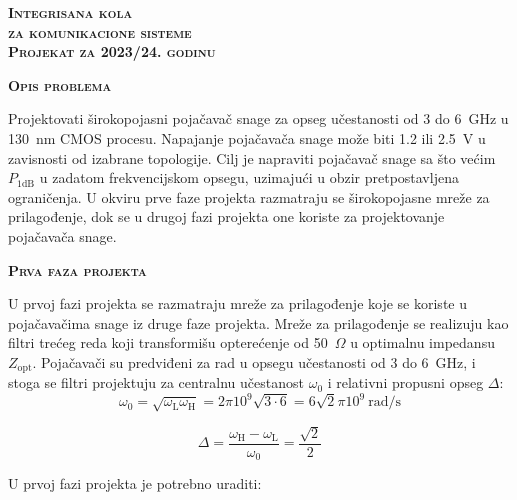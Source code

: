 \documentclass[a4paper]{article}
\begin{document}
\newcommand{\mr}[1]{\mathrm{#1}}
\renewcommand{\figurename}{Slika}

\begin{center}
\huge{\textbf{\textsc{Integrisana kola \\za komunikacione sisteme\\Projekat za 2023/24. godinu}}}
\end{center}


\begin{center}
\large{\textbf{\textsc{Opis problema}}}
\end{center}

Projektovati širokopojasni pojačavač snage za opseg učestanosti od 3 do 6~GHz u 130~nm CMOS procesu.
Napajanje pojačavača snage može biti 1.2 ili 2.5~V u zavisnosti od izabrane topologije.
Cilj je napraviti pojačavač snage sa što većim $P_\mr{1dB}$ u zadatom frekvencijskom opsegu, uzimajući u obzir pretpostavljena ograničenja.
U okviru prve faze projekta razmatraju se širokopojasne mreže za prilagođenje, dok se u drugoj fazi projekta one koriste za projektovanje pojačavača snage.


\begin{center}
\large{\textbf{\textsc{Prva faza projekta}}}
\end{center}

U prvoj fazi projekta se razmatraju mreže za prilagođenje koje se koriste u pojačavačima snage iz druge faze projekta.
Mreže za prilagođenje se realizuju kao filtri trećeg reda koji transformišu opterećenje od 50~$\Omega$ u optimalnu impedansu $Z_\mr{opt}$. 
Pojačavači su predviđeni za rad u opsegu učestanosti od 3 do 6~GHz, i stoga se filtri projektuju za centralnu učestanost $\omega_0$ i relativni propusni opseg $\Delta$:
\begin{equation*}
\omega_0 = \sqrt{\omega_\mr{L} \omega_\mr{H}} = 2 \pi 10^9 \sqrt{3\cdot 6} = 6 \sqrt{2} \pi 10^9~\mr{rad/s}
\end{equation*}

\begin{equation*}
\Delta = \frac{\omega_\mr{H}-\omega_\mr{L}}{\omega_0} = \frac{\sqrt{2}}{2}
\end{equation*}

U prvoj fazi projekta je potrebno uraditi:
\end{document}

